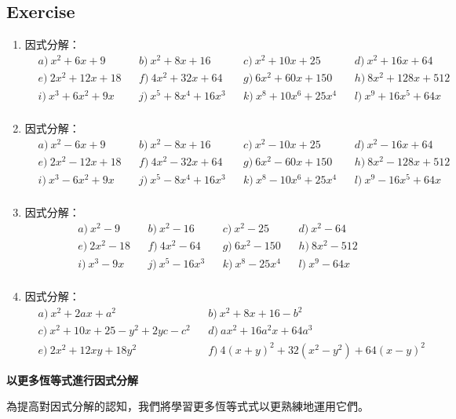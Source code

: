 \documentclass[12pt]{article}
\begin{document}
    \subsection*{Exercise}
    \begin{enumerate}
        \item 因式分解：\begin{align*}
            &a)\ x^2+6x+9&&b)\ x^2+8x+16&&c)\ x^2+10x+25&&d)\ x^2+16x+64\\
            &e)\ 2x^2+12x+18&&f)\ 4x^2+32x+64&&g)\ 6x^2+60x+150&&h)\ 8x^2+128x+512\\
            &i)\ x^3+6x^2+9x&&j)\ x^5+8x^4+16x^3&&k)\ x^8+10x^6+25x^4&&l)\ x^9+16x^5+64x\\
        \end{align*}
        \item 因式分解：\begin{align*}
            &a)\ x^2-6x+9&&b)\ x^2-8x+16&&c)\ x^2-10x+25&&d)\ x^2-16x+64\\
            &e)\ 2x^2-12x+18&&f)\ 4x^2-32x+64&&g)\ 6x^2-60x+150&&h)\ 8x^2-128x+512\\
            &i)\ x^3-6x^2+9x&&j)\ x^5-8x^4+16x^3&&k)\ x^8-10x^6+25x^4&&l)\ x^9-16x^5+64x\\
        \end{align*}
        \item 因式分解：\begin{align*}
            &a)\ x^2-9&&b)\ x^2-16&&c)\ x^2-25&&d)\ x^2-64\\
            &e)\ 2x^2-18&&f)\ 4x^2-64&&g)\ 6x^2-150&&h)\ 8x^2-512\\
            &i)\ x^3-9x&&j)\ x^5-16x^3&&k)\ x^8-25x^4&&l)\ x^9-64x\\
        \end{align*}
        \item 因式分解：\begin{align*}
            &a)\ x^2+2ax+a^2&&b)\ x^2+8x+16-b^2\\
            &c)\ x^2+10x+25-y^2+2yc-c^2&&d)\ ax^2+16a^2x+64a^3\\
            &e)\ 2x^2+12xy+18y^2&&f)\ 4(x+y)^2+32(x^2-y^2)+64(x-y)^2
        \end{align*}
    \end{enumerate}

    \begin{center}
        \textbf{以更多恆等式進行因式分解}
    \end{center}

    為提高對因式分解的認知，我們將學習更多恆等式式以更熟練地運用它們。
\end{document}

